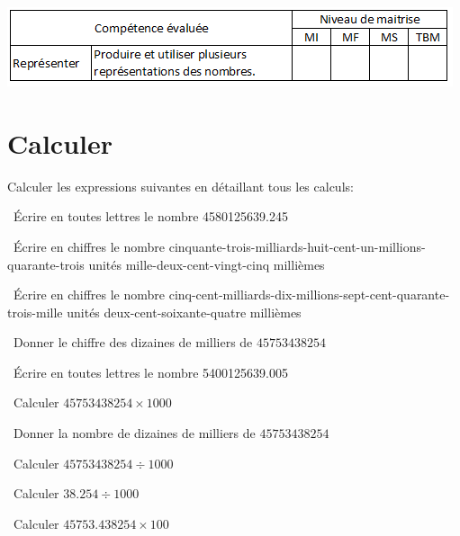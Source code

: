 	\includegraphics[scale=0.95]{competences}
	
	\section{Calculer}
	Calculer les expressions suivantes en détaillant tous les calculs:
	\begin{questions}
		
	
		\question[1]  \'Ecrire en toutes lettres le nombre \num{4580125639.245}
		
		\fillwithdottedlines{2cm}
			 
		\question[1]  \'Ecrire en chiffres le nombre cinquante-trois-milliards-huit-cent-un-millions-quarante-trois unités mille-deux-cent-vingt-cinq millièmes
		
		\fillwithdottedlines{2cm}
		
			
		
		\question[1]  \'Ecrire en chiffres le nombre cinq-cent-milliards-dix-millions-sept-cent-quarante-trois-mille unités deux-cent-soixante-quatre millièmes
		
		\fillwithdottedlines{2cm}
		
		\question[1]  Donner le chiffre des dizaines de milliers de $\num{45753438254}$
		
		\fillwithdottedlines{2cm}
	
		
		\question[1]  \'Ecrire en toutes lettres le nombre \num{5400125639.005}
		
		\fillwithdottedlines{2cm}
		
		\newpage
		
		\question[1]  Calculer $\num{45753438254} \times 1000$
		
		\fillwithdottedlines{2cm}
		
		\question[1]  Donner la nombre de dizaines de milliers de $\num{45753438254}$
		
		\fillwithdottedlines{2cm}
		
		
		\question[1]  Calculer $\num{45753438254} \div 1000$
		
		\fillwithdottedlines{2cm}
		
		
		\question[1]  Calculer $\num{38.254} \div 1000$
		
		\fillwithdottedlines{2cm}
		
		
		\question[1]  Calculer $\num{45753.438254} \times 100$
		
		\fillwithdottedlines{2cm}
		
	\end{questions}
	
	
